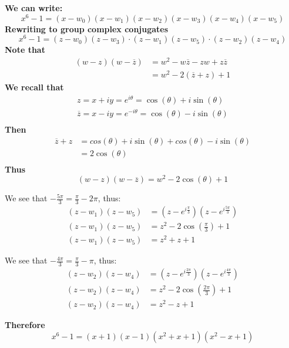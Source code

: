 \documentclass[a4paper, 8pt]{extarticle}
\begin{document}
\begin{examplebox}[Determine all solutions to $z^6 -1 = 0$ and factor $x^6-1$ as a product of linear and quadratic factors]
	\textbf{We can write:}
	$$x^6 -1 = (x - w_0)(x - w_1)(x - w_2)(x - w_3)(x - w_4)(x - w_5)$$
	\textbf{Rewriting to group complex conjugates}
	$$x^6 -1 = (z-w_0)(z-w_3) \cdot (z-w_1)(z-w_5) \cdot (z-w_2)(z-w_4)$$
	\textbf{Note that}
	\begin{align*}
		(w-z)(w-\overline{z}) & = w^2 - w\overline{z} - zw + z\overline{z} \\
		                      & = w^2 - 2(\overline{z} + z) + 1
	\end{align*}
	\textbf{We recall that}
	\begin{align*}
		z = x + iy = e^{i\theta} = \cos(\theta) + i\sin(\theta)             \\
		\overline{z} = x - iy = e^{-i\theta} = \cos(\theta) - i\sin(\theta) \\
	\end{align*}
	\textbf{Then}
	\begin{align*}
		\overline{z} + z & = cos(\theta) + i\sin(\theta) + cos(\theta) - i\sin(\theta) \\
		                 & = 2\cos(\theta)                                             \\
	\end{align*}
	\textbf{Thus}
	$$(w-z)(w-\overline{z})  = w^2 - 2\cos(\theta) + 1$$
	\begin{minipage}{0.49\textwidth}
		We see that $-\frac{5\pi}{3} = \frac{\pi}{3} - 2\pi$, thus:
		\begin{align*}
			(z-w_1)(z-w_5) & = (z - e^{i\frac{\pi}{3}})(z - e^{i\frac{5\pi}{3}}) \\
			(z-w_1)(z-w_5) & = z^2 - 2\cos\left(\frac{\pi}{3}\right) + 1         \\
			(z-w_1)(z-w_5) & = z^2 + z + 1
		\end{align*}
	\end{minipage}
	\begin{minipage}{0.5\textwidth}
		We see that $-\frac{4\pi}{3} = \frac{\pi}{3} - \pi$, thus:
		\begin{align*}
			(z-w_2)(z-w_4) & = (z - e^{i\frac{2\pi}{3}})(z - e^{i\frac{4\pi}{3}}) \\
			(z-w_2)(z-w_4) & = z^2 - 2\cos\left(\frac{2\pi}{3}\right) + 1         \\
			(z-w_2)(z-w_4) & = z^2 - z + 1
		\end{align*}
	\end{minipage}
	\textbf{Therefore}
	$$x^6 -1 = (x+1)(x-1)(x^2 + x + 1)(x^2 - x + 1)$$
\end{examplebox}
\end{document}
